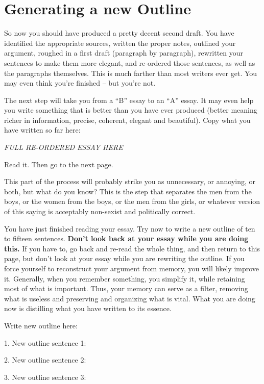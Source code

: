 \documentclass{article}
\begin{document}
\textbf{\hfill\break}

\section{Generating a new Outline}

So now you should have produced a pretty decent second draft. You have
identified the appropriate sources, written the proper notes, outlined
your argument, roughed in a first draft (paragraph by paragraph),
rewritten your sentences to make them more elegant, and re-ordered those
sentences, as well as the paragraphs themselves. This is much farther
than most writers ever get. You may even think you're finished -- but
you're not.

The next step will take you from a ``B'' essay to an ``A'' essay. It may
even help you write something that is better than you have ever produced
(better meaning richer in information, precise, coherent, elegant and
beautiful). Copy what you have written so far here:

\emph{FULL RE-ORDERED ESSAY HERE}

Read it. Then go to the next page.

This part of the process will probably strike you as unnecessary, or
annoying, or both, but what do you know? This is the step that separates
the men from the boys, or the women from the boys, or the men from the
girls, or whatever version of this saying is acceptably non-sexist and
politically correct.

\hl{\hfill\break}

You have just finished reading your essay. Try now to write a new
outline of ten to fifteen sentences. \textbf{Don't look back at your
essay while you are doing this.} If you have to, go back and re-read the
whole thing, and then return to this page, but don't look at your essay
while you are rewriting the outline. If you force yourself to
reconstruct your argument from memory, you will likely improve it.
Generally, when you remember something, you simplify it, while retaining
most of what is important. Thus, your memory can serve as a filter,
removing what is useless and preserving and organizing what is vital.
What you are doing now is distilling what you have written to its
essence.

Write new outline here:

1. New outline sentence 1:

2. New outline sentence 2:

3. New outline sentence 3:
\end{document}
